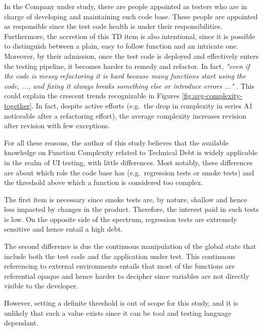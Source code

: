     In the Company under study, there are people appointed as testers who are in charge of developing and maintaining such code base. These people are appointed as responsible since the test code health is under their responsibilities. Furthermore, the accretion of this TD item is also intentional, since it is possible to distinguish between a plain, easy to follow function and an intricate one. Moreover, by their admission, once the test code is deployed and effectively enters the testing pipeline, it becomes harder to remedy and refactor. In fact, \textit{"even if the code is messy refactoring it is hard because many functions start using the code, ..., and fixing it always breaks something else or introduce errors ..." }. This could explain the crescent trends recognizable in Figures \ref{fig:avg-complexity-together}. In fact, despite active efforts (e.g.\ the drop in complexity in series A1 noticeable after a refactoring effort), the average complexity increases revision after revision with few exceptions.
    
    
    For all these reasons, the author of this study believes that the available knowledge on Function Complexity related to Technical Debt is widely applicable in the realm of UI testing, with little differences. Most notably, these differences are about which role the code base has (e.g.\ regression tests or smoke tests) and the threshold above which a function is considered too complex. 


     \label{sec:disc-rq3-function-complexity}    
    The first item is necessary since smoke tests are, by nature, shallow and hence less impacted by changes in the product. Therefore, the interest paid in such tests is low. On the opposite side of the spectrum, regression tests are extremely sensitive and hence entail a high debt.
    
    The second difference is due the continuous manipulation of the global state that include both the test code and the application under test. This continuous referencing to external environments entails that most of the functions are referential opaque \cite{referential_transparency} and hence harder to decipher since variables are not directly visible to the developer.
    
    However, setting a definite threshold is out of scope for this study, and it is unlikely that such a value exists since it can be tool and testing language dependant.
    
